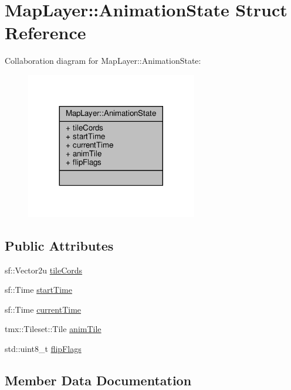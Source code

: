 \hypertarget{structMapLayer_1_1AnimationState}{}\section{Map\+Layer\+:\+:Animation\+State Struct Reference}
\label{structMapLayer_1_1AnimationState}


Collaboration diagram for Map\+Layer\+:\+:Animation\+State\+:
\nopagebreak
\begin{figure}[H]
\begin{center}
\leavevmode
\includegraphics[width=212pt]{structMapLayer_1_1AnimationState__coll__graph}
\end{center}
\end{figure}
\subsection*{Public Attributes}
\begin{DoxyCompactItemize}
\item 
sf\+::\+Vector2u \hyperlink{structMapLayer_1_1AnimationState_ab37c9495a8dce1f661f1f4e46b77f17f}{tile\+Cords}
\item 
sf\+::\+Time \hyperlink{structMapLayer_1_1AnimationState_aa9d9ceefb1f56dac58bc7660a1ba7898}{start\+Time}
\item 
sf\+::\+Time \hyperlink{structMapLayer_1_1AnimationState_a836c7a2799636527b08eeeb1783069e8}{current\+Time}
\item 
tmx\+::\+Tileset\+::\+Tile \hyperlink{structMapLayer_1_1AnimationState_aabe80ae4711c86db562b3e7b5e3bb6d1}{anim\+Tile}
\item 
std\+::uint8\+\_\+t \hyperlink{structMapLayer_1_1AnimationState_aa880baa2bb7e1e2f02d37ce7a6c0dc8a}{flip\+Flags}
\end{DoxyCompactItemize}


\subsection{Member Data Documentation}
\mbox{\label{structMapLayer_1_1AnimationState_aabe80ae4711c86db562b3e7b5e3bb6d1}} 
